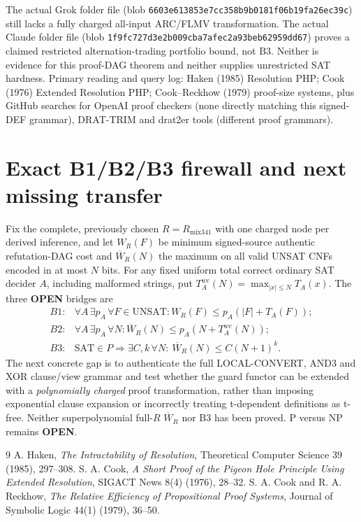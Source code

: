 \documentclass[11pt]{article}
\begin{document}
The actual Grok folder file
(blob \texttt{6603e613853e7cc358b9b0181f06b19fa26ec39c})
still lacks a fully charged all-input ARC/FLMV transformation.
The actual Claude folder file
(blob \texttt{1f9fc727d3e2b009cba7afec2a93beb62959dd67})
proves a claimed restricted alternation-trading portfolio
bound, not B3. Neither is evidence for this proof-DAG theorem
and neither supplies unrestricted SAT hardness.
Primary reading and query log: Haken (1985) Resolution
PHP; Cook (1976) Extended Resolution PHP;
Cook--Reckhow (1979) proof-size systems, plus
GitHub searches for OpenAI proof checkers (none directly
matching this signed-DEF grammar), DRAT-TRIM and drat2er
tools (different proof grammars).

\section*{Exact B1/B2/B3 firewall and next missing transfer}
Fix the complete, previously chosen $R=R_{\mathrm{mix341}}$
with one charged node per derived inference, and let
$W_R(F)$ be minimum signed-source authentic refutation-DAG
cost and $\overline W_R(N)$ the maximum on all valid UNSAT
CNFs encoded in at most $N$ bits. For any fixed uniform total
correct ordinary SAT decider $A$, including malformed strings,
put $T_A^{wc}(N)=\max_{|x|\le N}T_A(x)$.
The three \textbf{OPEN} bridges are
\[
\begin{array}{ll}
B1:&\forall A\,\exists p_A\,\forall F\in\mathrm{UNSAT}:
W_R(F)\le p_A(|F|+T_A(F));\\
B2:&\forall A\,\exists p_A\,\forall N:
\overline W_R(N)\le p_A(N+T_A^{wc}(N));\\
B3:&\mathrm{SAT}\in P\Longrightarrow
\exists C,k\,\forall N:\ \overline W_R(N)\le C(N+1)^k.
\end{array}
\]
The next concrete gap is to authenticate the full
LOCAL-CONVERT, AND3 and XOR clause/view grammar and
test whether the guard functor can be extended with
a \emph{polynomially charged} proof transformation,
rather than imposing exponential clause expansion
or incorrectly treating t-dependent definitions as t-free.
Neither superpolynomial full-$R$ $\overline W_R$ nor B3 has
been proved. P versus NP remains \textbf{OPEN}.

\begin{thebibliography}{9}
 A. Haken, \emph{The Intractability of Resolution},
Theoretical Computer Science 39 (1985), 297--308.
 S. A. Cook, \emph{A Short Proof of the Pigeon Hole
Principle Using Extended Resolution}, SIGACT News 8(4) (1976), 28--32.
 S. A. Cook and R. A. Reckhow, \emph{The Relative
Efficiency of Propositional Proof Systems}, Journal of Symbolic
Logic 44(1) (1979), 36--50.
\end{thebibliography}
\end{document}
